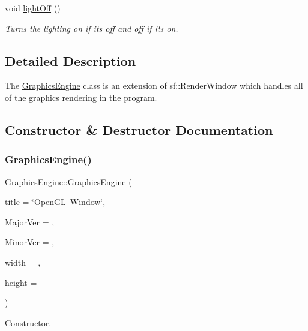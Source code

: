 \begin{DoxyCompactItemize}
\mbox{\label{class_graphics_engine_a64dff44b20167f494efe05fdfe8351d0}} 
void \hyperlink{class_graphics_engine_a64dff44b20167f494efe05fdfe8351d0}{light\+Off} ()
\begin{DoxyCompactList}\small\item\em Turns the lighting on if it\textquotesingle{}s off and off if it\textquotesingle{}s on. \end{DoxyCompactList}\end{DoxyCompactItemize}


\subsection{Detailed Description}
The \hyperlink{class_graphics_engine}{Graphics\+Engine} class is an extension of sf\+::\+Render\+Window which handles all of the graphics rendering in the program. 

\subsection{Constructor \& Destructor Documentation}
\mbox{\label{class_graphics_engine_a458fa2b36f864e0820a0a54ad58ff1c3}} 
\subsubsection{\texorpdfstring{Graphics\+Engine()}{GraphicsEngine()}}
{\footnotesize\ttfamily Graphics\+Engine\+::\+Graphics\+Engine (\begin{DoxyParamCaption}\item[{std\+::string}]{title = {\ttfamily \char`\"{}OpenGL~Window\char`\"{}},  }\item[{G\+Lint}]{Major\+Ver = {},  }\item[{G\+Lint}]{Minor\+Ver = {},  }\item[{int}]{width = {},  }\item[{int}]{height = {} }\end{DoxyParamCaption})}



Constructor. 


